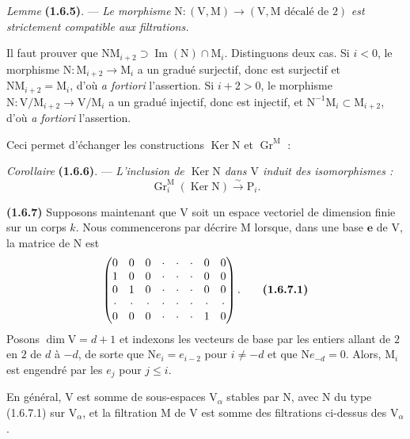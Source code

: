 \documentclass[11pt,leqno]{article}
\begin{document}
\textit{Lemme} \textbf{(1.6.5)}. — \textit{Le morphisme} \(\mathrm{N}:(\mathrm{V},\mathrm{M})\to(\mathrm{V},\mathrm{M}\text{ décalé de }2)\) \textit{est strictement compatible aux filtrations.}

Il faut prouver que \(\mathrm{N}\mathrm{M}_{i+2}\supset\operatorname{Im}(\mathrm{N})\cap\mathrm{M}_i\). Distinguons deux cas. Si \(i<0\), le morphisme \(\mathrm{N}:\mathrm{M}_{i+2}\to\mathrm{M}_i\) a un gradué surjectif, donc est surjectif et \(\mathrm{N}\mathrm{M}_{i+2}=\mathrm{M}_i\), d’où \textit{a fortiori} l’assertion. Si \(i+2>0\), le morphisme \(\mathrm{N}:\mathrm{V}/\mathrm{M}_{i+2}\to\mathrm{V}/\mathrm{M}_i\) a un gradué injectif, donc est injectif, et \(\mathrm{N}^{-1}\mathrm{M}_i\subset\mathrm{M}_{i+2}\), d’où \textit{a fortiori} l’assertion.

Ceci permet d’échanger les constructions \(\operatorname{Ker}\mathrm{N}\) et \(\operatorname{Gr}^{\mathrm{M}}\) :

\textit{Corollaire} \textbf{(1.6.6)}. — \textit{L’inclusion de \(\operatorname{Ker}\mathrm{N}\) dans \(\mathrm{V}\) induit des isomorphismes :}
\[
\operatorname{Gr}_i^{\mathrm{M}}(\operatorname{Ker}\mathrm{N})
\xrightarrow{\sim}\mathrm{P}_i.
\]

\textbf{(1.6.7)} Supposons maintenant que \(\mathrm{V}\) soit un espace vectoriel de dimension finie sur un corps \(k\). Nous commencerons par décrire \(\mathrm{M}\) lorsque, dans une base \(\mathbf{e}\) de \(\mathrm{V}\), la matrice de \(\mathrm{N}\) est
\[
\begin{pmatrix}
0 & 0 & 0 & \cdot & \cdot & \cdot & 0 & 0\\
1 & 0 & 0 & \cdot & \cdot & \cdot & 0 & 0\\
0 & 1 & 0 & \cdot & \cdot & \cdot & 0 & 0\\
\cdot & \cdot & \cdot & \cdot & \cdot & \cdot & \cdot & \cdot\\
0 & 0 & 0 & \cdot & \cdot & \cdot & 1 & 0
\end{pmatrix}.
\tag*{\textbf{(1.6.7.1)}}
\]
Posons \(\dim\mathrm{V}=d+1\) et indexons les vecteurs de base par les entiers allant de \(2\) en \(2\) de \(d\) à \(-d\), de sorte que \(\mathrm{N}e_i=e_{i-2}\) pour \(i\ne -d\) et que \(\mathrm{N}e_{-d}=0\). Alors, \(\mathrm{M}_i\) est engendré par les \(e_j\) pour \(j\le i\).

En général, \(\mathrm{V}\) est somme de sous-espaces \(\mathrm{V}_\alpha\) stables par \(\mathrm{N}\), avec \(\mathrm{N}\) du type (1.6.7.1) sur \(\mathrm{V}_\alpha\), et la filtration \(\mathrm{M}\) de \(\mathrm{V}\) est somme des filtrations ci-dessus des \(\mathrm{V}_\alpha\).
\end{document}
